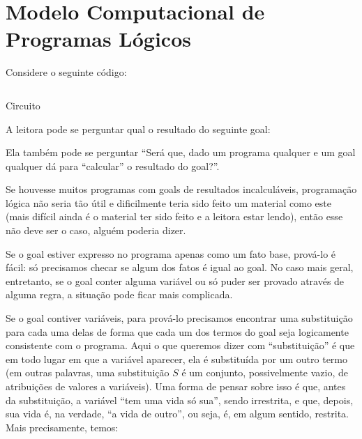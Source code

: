 \documentclass{article}
\begin{document}
\section{Modelo Computacional de Programas Lógicos}

Considere o seguinte código:

    \begin{listing}
\inputminted{prolog}{../Exemplos/Cap1/prog1_circuito.pl}\label{lst:circuit}
\caption{Circuito}
    \end{listing}

A leitora pode se perguntar qual o resultado do seguinte goal:


 Ela também pode se perguntar ``Será que, dado um programa qualquer e um goal qualquer dá para ``calcular'' o resultado
 do goal?''.


Se houvesse muitos programas com goals de resultados incalculáveis,
programação lógica não seria tão útil e dificilmente teria sido feito
um material como este (mais difícil ainda é o material ter sido feito
e a leitora estar lendo), então esse não deve ser o caso, alguém
poderia dizer.

Se o goal estiver expresso no programa apenas como um fato base,
prová-lo é fácil: só precisamos checar se algum dos fatos é igual ao
goal. No caso mais geral, entretanto, se o goal conter alguma variável ou só puder
ser provado através de alguma regra, a situação pode ficar mais complicada.

Se o goal contiver variáveis, para prová-lo precisamos encontrar uma substituição para cada uma delas de forma
que cada um dos termos do goal seja logicamente consistente com o
programa. Aqui o que queremos dizer com ``substituição'' é que em todo
lugar em que a variável aparecer, ela é substituída por um outro termo
(em outras palavras, uma substituição $S$ é um conjunto, possivelmente
vazio, de atribuições de valores a variáveis). 
Uma forma de pensar sobre isso é que, antes da substituição, a variável ``tem uma vida só
sua'', sendo irrestrita, e que, depois, sua vida é, na verdade, ``a vida de
outro'', ou seja, é, em algum sentido, restrita. Mais precisamente, temos:\\
\end{document}
